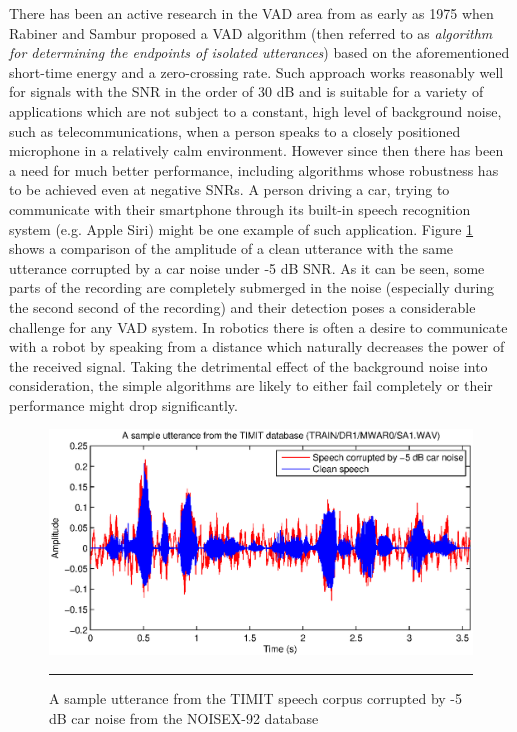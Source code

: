 There has been an active research in the VAD area from as early as 1975 when Rabiner and Sambur \cite{RabinerSambur} proposed a VAD algorithm (then referred to as \emph{algorithm for determining the endpoints of isolated utterances}) based on the aforementioned short-time energy and a zero-crossing rate. Such approach works reasonably well for signals with the SNR in the order of 30 dB and is suitable for a variety of applications which are not subject to a constant, high level of background noise, such as telecommunications, when a person speaks to a closely positioned microphone in a relatively calm environment. However since then there has been a need for much better performance, including algorithms whose robustness has to be achieved even at negative SNRs. A person driving a car, trying to communicate with their smartphone through its built-in speech recognition system (e.g. Apple Siri) might be one example of such application. Figure \ref{fig:corruptedSpeech} shows a comparison of the amplitude of a clean utterance with the same utterance corrupted by a car noise under -5 dB SNR. As it can be seen, some parts of the recording are completely submerged in the noise (especially during the second second of the recording) and their detection poses a considerable challenge for any VAD system. In robotics there is often a desire to communicate with a robot by speaking from a distance which naturally decreases the power of the received signal. Taking the detrimental effect of the background noise into consideration, the simple algorithms are likely to either fail completely or their performance might drop significantly.

\begin{figure}[htbp]
	\centering
		\includegraphics[width=0.9\columnwidth]{Figures/Chapter1/corruptedSpeech.eps}
		\rule{37em}{0.5pt}
	\caption[A sample utterance corrupted by -5 dB car noise]{A sample utterance from the TIMIT \cite{TIMIT} speech corpus corrupted by -5 dB car noise from the NOISEX-92 \cite{NOISEX} database}
	\label{fig:corruptedSpeech}
\end{figure}

